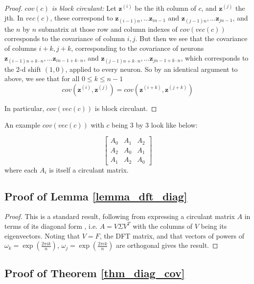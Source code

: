 \documentclass{article} %
\begin{document}
\begin{proof}
\textit{$cov(c)$ is block circulant:}
Let $\pmb{z}^{(i)}$ be the ith column of $c$, and $\pmb{z}^{(j)}$ the jth. In $vec(c)$, these correspond to $\pmb{z}_{(i-1)n}, \dots \pmb{z}_{in - 1}$ and $\pmb{z}_{(j-1)n}, \dots \pmb{z}_{jn - 1}$, and the $n$ by $n$ submatrix at those row and column indexes of $cov(vec(c))$ corresponds to the covariance of column $i, j$. But then we see that the covariance of columns $i+k, j+k$, corresponding to the covariance of neurons $\pmb{z}_{(i-1)n + k \cdot n}, \dots \pmb{z}_{in - 1 + k \cdot n}$, and $\pmb{z}_{(j-1)n + k\cdot n}, \dots \pmb{z}_{jn - 1 + k \cdot n}$, which corresponds to the 2-d shift $(1, 0)$, applied to every neuron. So by an identical argument to above, we see that for all $0 \leq k \leq n-1$
\[ cov(\pmb{z}^{(i)}, \pmb{z}^{(j)}) = cov(\pmb{z}^{(i + k)}, \pmb{z}^{(j + k)}) \]

In particular, $cov(vec(c))$ is block circulant.
\end{proof}

An example $cov(vec(c))$ with $c$ being $3$ by $3$ look like below:

\[
\begin{bmatrix}
    A_0 & A_1 &  A_2 \\
    A_2 & A_0 & A_1 \\
   A_1 & A_2 & A_0
\end{bmatrix}
\]
where each $A_i$ is itself a circulant matrix.

\subsection{Proof of Lemma \ref{lemma_dft_diag}}

\begin{proof}
This is a standard result, following from expressing a circulant matrix $A$ in terms of its diagonal form , i.e. $A = V \Sigma V^T$ with the columns of $V$ being its eigenvectors. Noting that $V = F$, the DFT matrix, and that vectors of powers of $\omega_k = \exp(\frac{2\pi i k}{n})$, $\omega_j = \exp(\frac{2\pi i k}{n})$ are orthogonal gives the result.
\end{proof}


\subsection{Proof of Theorem \ref{thm_diag_cov}}
\end{document}
